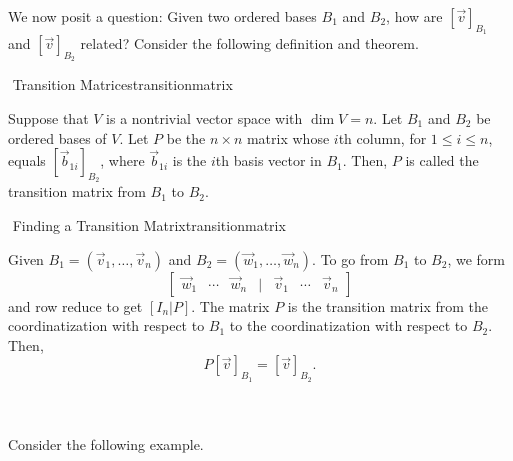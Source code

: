         We now posit a question: Given two ordered bases \(B_1\) and \(B_2\), how are \([\vec{v}]_{B_1}\) and \([\vec{v}]_{B_2}\) related? Consider the following definition and theorem.
        \begin{definition}{\Stop\,\,Transition Matrices}{transitionmatrix}

            Suppose that \(V\) is a nontrivial vector space with \(\dim V=n\). Let \(B_1\) and \(B_2\) be ordered bases of \(V\). Let \(P\) be the \(n\times n\) matrix whose \(i\)th column, for \(1\leq i\leq n\), equals \([\vec{b}_{1i}]_{B_2}\), where \(\vec{b}_{1i}\) is the \(i\)th basis vector in \(B_1\). Then, \(P\) is called the transition matrix from \(B_1\) to \(B_2\).
            
        \end{definition}
        \begin{theorem}{\Stop\,\,Finding a Transition Matrix}{transitionmatrix}

            Given \(B_1=(\vec{v}_1,\ldots,\vec{v}_n)\) and \(B_2=(\vec{w}_1,\ldots,\vec{w}_n)\). To go from \(B_1\) to \(B_2\), we form
            \begin{equation*}
                \begin{bmatrix}
                    \vec{w}_1 & \cdots & \vec{w}_n & | & \vec{v}_1 & \cdots & \vec{v}_n
                \end{bmatrix}
            \end{equation*}
            and row reduce to get \([I_n|P]\). The matrix \(P\) is the transition matrix from the coordinatization with respect to \(B_1\) to the coordinatization with respect to \(B_2\). Then,
            \begin{equation*}
                P[\vec{v}]_{B_1}=[\vec{v}]_{B_2}.
            \end{equation*}
            
        \end{theorem}
        \vphantom
        \\
        \\
        Consider the following example.
